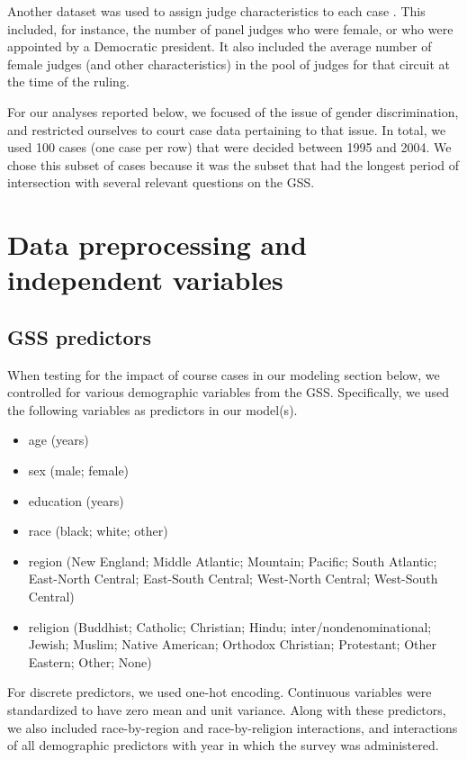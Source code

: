 \documentclass{article}
\providecommand{\tightlist}{\setlength{\itemsep}{0pt}\setlength{\parskip}{0pt}}%
\begin{document}
Another dataset was used to assign judge characteristics to each case
\cite{eb60c240-7076-4b7f-829d-9b68e9f5494c}. This included, for
instance, the number of panel judges who were female, or who were
appointed by a Democratic president. It also included the average number
of female judges (and other characteristics) in the pool of judges for
that circuit at the time of the ruling.

For our analyses reported below, we focused of the issue of gender
discrimination, and restricted ourselves to court case data pertaining
to that issue. In total, we used 100 cases (one case per row) that were
decided between 1995 and 2004. We chose this subset of cases because it
was the subset that had the longest period of intersection with several
relevant questions on the GSS.


\section{Data preprocessing and independent
variables}\label{data-preprocessing-and-independent-variables}

\subsection{GSS predictors}\label{gss-predictors}

When testing for the impact of course cases in our modeling section
below, we controlled for various demographic variables from the GSS.
Specifically, we used the following variables as predictors in our
model(s).

\begin{itemize}
\tightlist
\item
  age (years)
\item
  sex (male; female)
\item
  education (years)
\item
  race (black; white; other)
\item
  region (New England; Middle Atlantic; Mountain; Pacific; South
  Atlantic; East-North Central; East-South Central; West-North Central;
  West-South Central)
\item
  religion (Buddhist; Catholic; Christian; Hindu;
  inter/nondenominational; Jewish; Muslim; Native American; Orthodox
  Christian; Protestant; Other Eastern; Other; None)
\end{itemize}

For discrete predictors, we used one-hot encoding. Continuous variables
were standardized to have zero mean and unit variance. Along with these
predictors, we also included race-by-region and race-by-religion
interactions, and interactions of all demographic predictors with year
in which the survey was administered.
\end{document}

